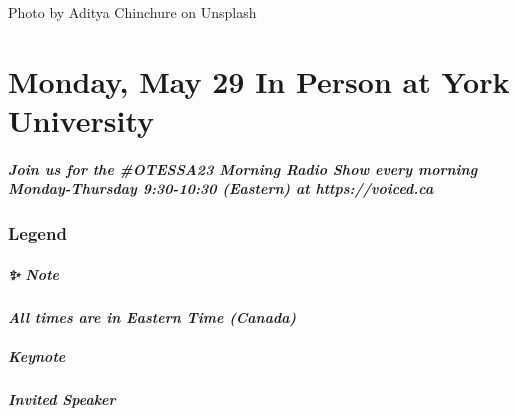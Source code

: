 \documentclass[
]{book}
\begin{document}
Photo by Aditya Chinchure on Unsplash

\hypertarget{monday-may-29-in-person-at-york-university}{%
\chapter{Monday, May 29 \textbar{} In Person at York University}\label{monday-may-29-in-person-at-york-university}}

\begin{protip}
\hypertarget{join-us-for-the-otessa23-morning-radio-show-every-morning-monday-thursday-930-1030-eastern-at-httpsvoiced.ca}{%
\paragraph{Join us for the \#OTESSA23 Morning Radio Show every morning
Monday-Thursday 9:30-10:30 (Eastern) at
https://voiced.ca}\label{join-us-for-the-otessa23-morning-radio-show-every-morning-monday-thursday-930-1030-eastern-at-httpsvoiced.ca}}
\end{protip}

\hypertarget{legend-1}{%
\subsection*{Legend}\label{legend-1}}

\begin{protip}
\hypertarget{note}{%
\paragraph*{✨ Note}\label{note}}

\textbf{\emph{All times are in Eastern Time (Canada)}}
\end{protip}

\begin{keynote}
\hypertarget{keynote}{%
\paragraph{Keynote}\label{keynote}}
\end{keynote}

\begin{speaker}
\hypertarget{invited-speaker}{%
\paragraph{Invited Speaker}\label{invited-speaker}}
\end{speaker}
\end{document}
